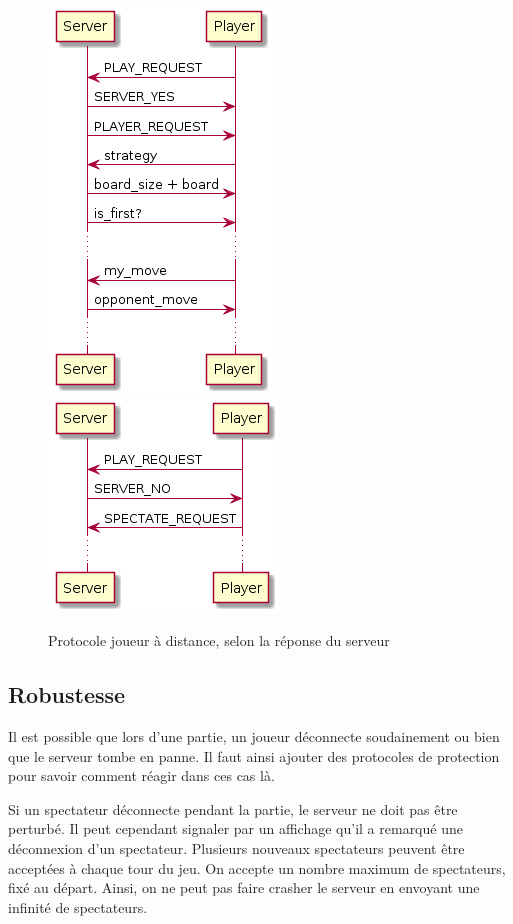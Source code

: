 \documentclass[a4paper]{article}
\begin{document}
%
\begin{figure}[H]
	\centering
	\includegraphics[scale=0.6]{playeryes.png} \hspace{1cm}
	\includegraphics[scale=0.6]{playerno.png}
	\caption{Protocole joueur à distance, selon la réponse du serveur}
\end{figure}
%


\subsection{Robustesse}

Il est possible que lors d'une partie, un joueur déconnecte soudainement ou 
bien que le serveur tombe en panne. Il faut ainsi ajouter des protocoles de 
protection pour savoir comment réagir dans ces cas là.

Si un spectateur déconnecte pendant la partie, le serveur ne doit pas être 
perturbé. Il peut cependant signaler par un affichage qu'il a remarqué une 
déconnexion d'un spectateur.
Plusieurs nouveaux spectateurs peuvent être acceptées à chaque tour du jeu. On accepte un nombre maximum de spectateurs, fixé au départ.
Ainsi, on ne peut pas faire crasher le serveur en envoyant une infinité de spectateurs. \\
\end{document}

